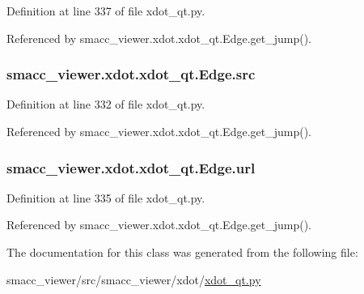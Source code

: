 Definition at line 337 of file xdot\+\_\+qt.\+py.



Referenced by smacc\+\_\+viewer.\+xdot.\+xdot\+\_\+qt.\+Edge.\+get\+\_\+jump().

\subsubsection[{\texorpdfstring{src}{src}}]{\setlength{\rightskip}{0pt plus 5cm}smacc\+\_\+viewer.\+xdot.\+xdot\+\_\+qt.\+Edge.\+src}\hypertarget{classsmacc__viewer_1_1xdot_1_1xdot__qt_1_1Edge_a5689e7ea2be54c94ae961b28c75199da}{}\label{classsmacc__viewer_1_1xdot_1_1xdot__qt_1_1Edge_a5689e7ea2be54c94ae961b28c75199da}


Definition at line 332 of file xdot\+\_\+qt.\+py.



Referenced by smacc\+\_\+viewer.\+xdot.\+xdot\+\_\+qt.\+Edge.\+get\+\_\+jump().

\subsubsection[{\texorpdfstring{url}{url}}]{\setlength{\rightskip}{0pt plus 5cm}smacc\+\_\+viewer.\+xdot.\+xdot\+\_\+qt.\+Edge.\+url}\hypertarget{classsmacc__viewer_1_1xdot_1_1xdot__qt_1_1Edge_acadf98140ce469bcbf1856232220ead7}{}\label{classsmacc__viewer_1_1xdot_1_1xdot__qt_1_1Edge_acadf98140ce469bcbf1856232220ead7}


Definition at line 335 of file xdot\+\_\+qt.\+py.



Referenced by smacc\+\_\+viewer.\+xdot.\+xdot\+\_\+qt.\+Edge.\+get\+\_\+jump().



The documentation for this class was generated from the following file\+:\begin{DoxyCompactItemize}
\item 
smacc\+\_\+viewer/src/smacc\+\_\+viewer/xdot/\hyperlink{xdot__qt_8py}{xdot\+\_\+qt.\+py}\end{DoxyCompactItemize}
